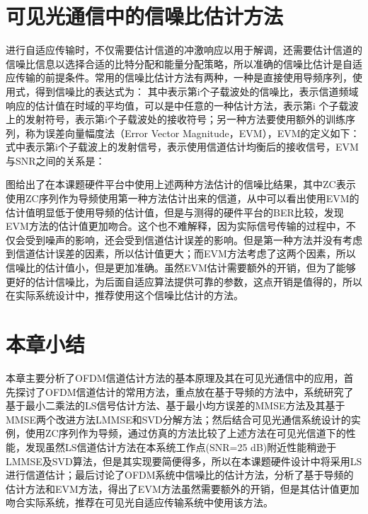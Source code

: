 \section{可见光通信中的信噪比估计方法}
进行自适应传输时，不仅需要估计信道的冲激响应以用于解调，还需要估计信道的信噪比信息以选择合适的比特分配和能量分配策略，所以准确的信噪比估计是自适应传输的前提条件。常用的信噪比估计方法有两种，一种是直接使用导频序列，使用式，得到信噪比的表达式为：
其中表示第i个子载波处的信噪比，表示信道频域响应的估计值在时域的平均值，可以是中任意的一种估计方法，表示第i 个子载波上的发射符号，表示第i个子载波处的接收符号；另一种方法要使用额外的训练序列，称为误差向量幅度法（Error Vector Magnitude，EVM），EVM的定义如下：
式中表示第i个子载波上的发射信号，表示使用信道估计均衡后的接收信号，EVM与SNR之间的关系是\cite{shafik2006extended}：

图给出了在本课题硬件平台中使用上述两种方法估计的信噪比结果，其中ZC表示使用ZC序列作为导频使用第一种方法估计出来的信道，从中可以看出使用EVM的估计值明显低于使用导频的估计值，但是与测得的硬件平台的BER比较，发现EVM方法的估计值更加吻合。这个也不难解释，因为实际信号传输的过程中，不仅会受到噪声的影响，还会受到信道估计误差的影响。但是第一种方法并没有考虑到信道估计误差的因素，所以估计值更大；而EVM方法考虑了这两个因素，所以信噪比的估计值小，但是更加准确。虽然EVM估计需要额外的开销，但为了能够更好的估计信噪比，为后面自适应算法提供可靠的参数，这点开销是值得的，所以在实际系统设计中，推荐使用这个信噪比估计的方法。
\section{本章小结}
本章主要分析了OFDM信道估计方法的基本原理及其在可见光通信中的应用，首先探讨了OFDM信道估计的常用方法，重点放在基于导频的方法中，系统研究了基于最小二乘法的LS信号估计方法、基于最小均方误差的MMSE方法及其基于MMSE两个改进方法LMMSE和SVD分解方法；然后结合可见光通信系统设计的实例，使用ZC序列作为导频，通过仿真的方法比较了上述方法在可见光信道下的性能，发现虽然LS信道估计方法在本系统工作点(SNR=25 dB)附近性能稍逊于LMMSE及SVD算法，但是其实现要简便得多，所以在本课题硬件设计中将采用LS进行信道估计；最后讨论了OFDM系统中信噪比的估计方法，分析了基于导频的估计方法和EVM方法，得出了EVM方法虽然需要额外的开销，但是其估计值更加吻合实际系统，推荐在可见光自适应传输系统中使用该方法。
